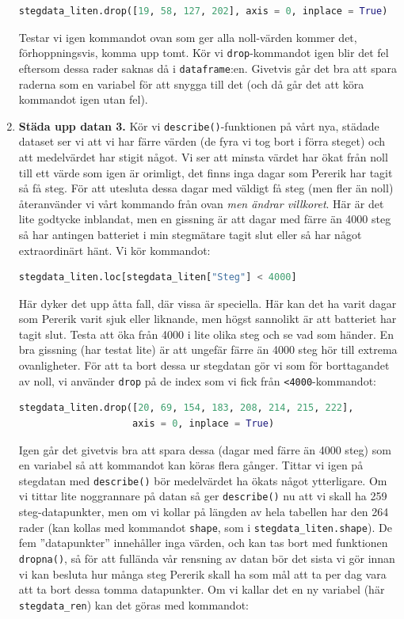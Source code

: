 \documentclass{article}
\begin{document}
\begin{enumerate}
\begin{lstlisting}[language=Python]
stegdata_liten.drop([19, 58, 127, 202], axis = 0, inplace = True)
\end{lstlisting}
Testar vi igen kommandot ovan som ger alla noll-värden kommer det, förhoppningsvis, komma upp tomt. Kör vi \verb+drop+-kommandot igen blir det fel eftersom dessa rader saknas då i \verb+dataframe+:en. Givetvis går det bra att spara raderna som en variabel för att snygga till det (och då går det att köra kommandot igen utan fel). 
\item \textbf{Städa upp datan 3.} Kör vi \verb+describe()+-funktionen på vårt nya, städade dataset ser vi att vi har färre värden (de fyra vi tog bort i förra steget) och att medelvärdet har stigit något. Vi ser att minsta värdet har ökat från noll till ett värde som igen är orimligt, det finns inga dagar som Pererik har tagit så få steg. För att utesluta dessa dagar med väldigt få steg (men fler än noll) återanvänder vi vårt kommando från ovan \emph{men ändrar villkoret}. Här är det lite godtycke inblandat, men en gissning är att dagar med färre än 4000 steg så har antingen batteriet i min stegmätare tagit slut eller så har något extraordinärt hänt. Vi kör kommandot:
\begin{lstlisting}[language=Python]
stegdata_liten.loc[stegdata_liten["Steg"] < 4000]    
\end{lstlisting}
Här dyker det upp åtta fall, där vissa är speciella. Här kan det ha varit dagar som Pererik varit sjuk eller liknande, men högst sannolikt är att batteriet har tagit slut. Testa att öka från 4000 i lite olika steg och se vad som händer. En bra gissning (har testat lite) är att ungefär färre än 4000 steg hör till extrema ovanligheter. För att ta bort dessa ur stegdatan gör vi som för borttagandet av noll, vi använder \verb+drop+ på de index som vi fick från \verb+<4000+-kommandot:
\begin{lstlisting}[language=Python]
stegdata_liten.drop([20, 69, 154, 183, 208, 214, 215, 222], 
                    axis = 0, inplace = True)
\end{lstlisting}
Igen går det givetvis bra att spara dessa (dagar med färre än 4000 steg) som en variabel så att kommandot kan köras flera gånger. Tittar vi igen på stegdatan med \verb+describe()+ bör medelvärdet ha ökats något ytterligare. Om vi tittar lite noggrannare på datan så ger \verb+describe()+ nu att vi skall ha 259 steg-datapunkter, men om vi kollar på längden av hela tabellen har den 264 rader (kan kollas med kommandot \verb+shape+, som i \lstinline[language=Python]{stegdata_liten.shape}). De fem ”datapunkter” innehåller inga värden, och kan tas bort med funktionen \verb+dropna()+, så för att fullända vår rensning av datan bör det sista vi gör innan vi kan besluta hur många steg Pererik skall ha som mål att ta per dag vara att ta bort dessa tomma datapunkter. Om vi kallar det en ny variabel (här \verb+stegdata_ren+) kan det göras med kommandot:

\end{enumerate}
\end{document}

